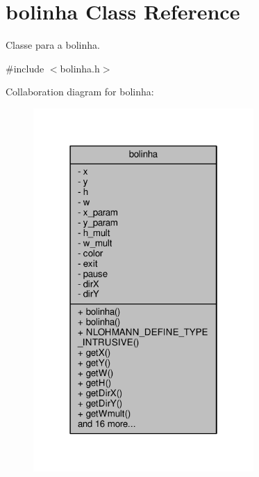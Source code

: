 \hypertarget{classbolinha}{}\section{bolinha Class Reference}
\label{classbolinha}


Classe para a bolinha.  




{\ttfamily \#include $<$bolinha.\+h$>$}



Collaboration diagram for bolinha\+:
\nopagebreak
\begin{figure}[H]
\begin{center}
\leavevmode
\includegraphics[width=238pt]{classbolinha__coll__graph}
\end{center}
\end{figure}
